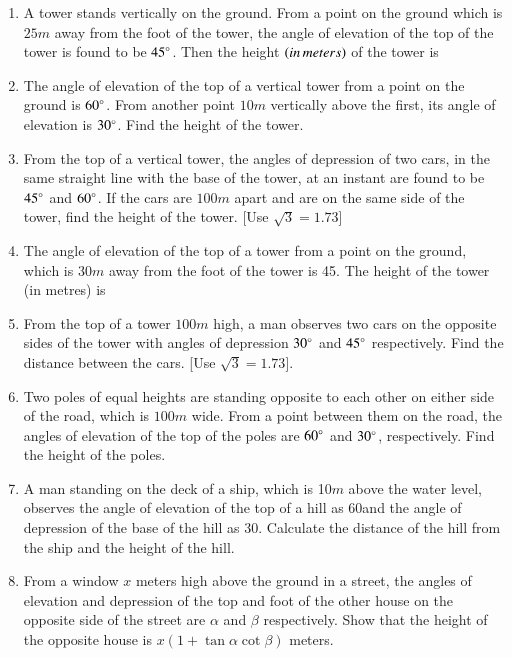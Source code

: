 \begin{enumerate}[label=\thesubsection.\arabic*.,ref=\thesubsection.\theenumi]
\hfill{}
\item A tower stands vertically on the ground. From a point on the ground which is $25m$ away from the foot of the tower, the angle of elevation of the top of the tower is found to be $45\degree$. Then the height $\left(in\,meters\right)$ of the tower is
%
%
%
\hfill{}\item The angle of elevation of the top of a vertical tower from a point on the ground is $60\degree$. From another point $10m$ vertically above the first, its angle of elevation is $30\degree$. Find the height of the tower.
%
%
\hfill{}\item From the top of a vertical tower, the angles of depression of two cars, in the same straight line with the base of the tower, at an instant are found to be $45\degree$ and $60\degree$. If the cars are $100m$ apart and are on the same side of the tower, find the height of the tower. 
%
[Use $\sqrt{3} = 1.73$]
\hfill{}
    \item The angle of elevation of the top of a tower from a point on the ground, which is 30$m$ away from the foot of the tower is 45\degree. The height of the tower (in metres) is
    \hfill{}\item From the top of a tower $100m$ high, a man observes two cars on the opposite sides of the tower with angles of depression $30\degree$ and $45\degree$ respectively. Find the distance between the cars. [Use $\sqrt{3}=1.73$].
    \hfill{}\item Two poles of equal heights are standing opposite to each other on either side of the road, which is $100m$ wide. From a point between them on the road, the angles of elevation of the top of the poles are $60\degree$ and $30\degree$, respectively. Find the height of the poles.
\hfill{}
%
\item A man standing on the deck of a ship, which is 10$m$ above the water level, observes the
angle of elevation of the top of a hill as 60\degree and the angle of depression of the base of the hill as
30\degree. Calculate the distance of the hill from the ship and the height of the hill.
%
\hfill{}\item From a window $x$ meters high above the ground in a street, the angles of elevation and depression of the top and foot of the other house on the opposite side of the street are $\alpha$ and $\beta$ respectively. Show that the height of the opposite house is $x(1 + \tan \alpha \cot \beta)$ meters.
%
\hfill{}

\end{enumerate}
